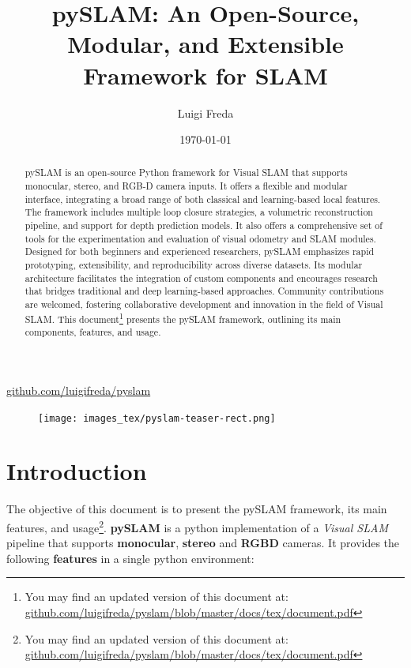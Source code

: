 \documentclass{article}
\title{pySLAM: An Open-Source, Modular, and Extensible Framework for SLAM}
\author{Luigi Freda}
\date{\small \today}  %
\begin{document}
\maketitle
\begin{center}
  \href{https://github.com/luigifreda/pyslam}{github.com/luigifreda/pyslam}
\end{center}

\begin{abstract}
pySLAM is an open-source Python framework for Visual SLAM that supports monocular, stereo, and RGB-D camera inputs. It offers a flexible and modular interface, integrating a broad range of both classical and learning-based local features. The framework includes multiple loop closure strategies, a volumetric reconstruction pipeline, and support for depth prediction models. It also offers a comprehensive set of tools for the experimentation and evaluation of visual odometry and SLAM modules.
Designed for both beginners and experienced researchers, pySLAM emphasizes rapid prototyping, extensibility, and reproducibility across diverse datasets. Its modular architecture facilitates the integration of custom components and encourages research that bridges traditional and deep learning-based approaches. Community contributions are welcomed, fostering collaborative development and innovation in the field of Visual SLAM.
This document\footnote{You may find an updated version of this document at:\\ \href{https://github.com/luigifreda/pyslam/blob/master/docs/tex/document.pdf}{github.com/luigifreda/pyslam/blob/master/docs/tex/document.pdf}} presents the pySLAM framework, outlining its main components, features, and usage.
\end{abstract}

\begin{figure}[htbp]
  \centering
  \texttt{[image: images\_tex/pyslam-teaser-rect.png]}
  \label{fig:teaser}
\end{figure}

\tableofcontents

\pagebreak

\section{Introduction}

The objective of this document is to present the pySLAM framework, its main features, and usage\footnote{You may find an updated version of this document at:\\ \href{https://github.com/luigifreda/pyslam/blob/master/docs/tex/document.pdf}{github.com/luigifreda/pyslam/blob/master/docs/tex/document.pdf}}. \textbf{pySLAM} is a python implementation of a \emph{Visual SLAM} pipeline that supports \textbf{monocular}, \textbf{stereo} and
\textbf{RGBD} cameras. It provides the following \textbf{features} in a single python environment: 
\end{document}
